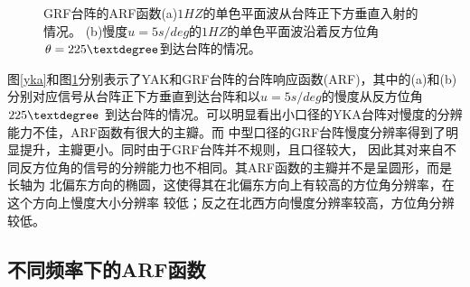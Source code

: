 \begin{figure}[tbph]
\hfill{}
\hfill{}
\hfill{}
\caption{GRF台阵的ARF函数(a)$1HZ$的单色平面波从台阵正下方垂直入射的情况。%
(b)慢度$u=5 s/deg$的$1HZ$的单色平面波沿着反方位角$\theta = 225\textdegree$到达台阵的情况。}
\label{grf}
\end{figure}

图\ref{yka}和图\ref{grf}分别表示了YAK和GRF台阵的台阵响应函数(ARF)，其中的(a)和(b)
分别对应信号从台阵正下方垂直到达台阵和以$u=5s/deg$的慢度从反方位角$225\textdegree$
到达台阵的情况。可以明显看出小口径的YKA台阵对慢度的分辨能力不佳，ARF函数有很大的主瓣。而
中型口径的GRF台阵慢度分辨率得到了明显提升，主瓣更小。同时由于GRF台阵并不规则，且口径较大，
因此其对来自不同反方位角的信号的分辨能力也不相同。其ARF函数的主瓣并不是呈圆形，而是长轴为
北偏东方向的椭圆，这使得其在北偏东方向上有较高的方位角分辨率，在这个方向上慢度大小分辨率
较低；反之在北西方向慢度分辨率较高，方位角分辨较低。

\subsection{不同频率下的ARF函数}

